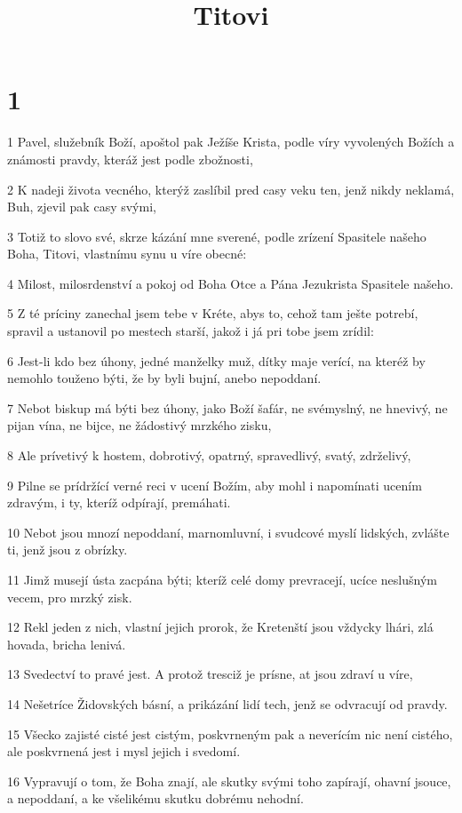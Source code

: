

\title{Titovi}

\chapter{1}

\par 1 Pavel, služebník Boží, apoštol pak Ježíše Krista, podle víry vyvolených Božích a známosti pravdy, kteráž jest podle zbožnosti,
\par 2 K nadeji života vecného, kterýž zaslíbil pred casy veku ten, jenž nikdy neklamá, Buh, zjevil pak casy svými,
\par 3 Totiž to slovo své, skrze kázání mne sverené, podle zrízení Spasitele našeho Boha, Titovi, vlastnímu synu u víre obecné:
\par 4 Milost, milosrdenství a pokoj od Boha Otce a Pána Jezukrista Spasitele našeho.
\par 5 Z té príciny zanechal jsem tebe v Kréte, abys to, cehož tam ješte potrebí, spravil a ustanovil po mestech starší, jakož i já pri tobe jsem zrídil:
\par 6 Jest-li kdo bez úhony, jedné manželky muž, dítky maje verící, na kteréž by nemohlo touženo býti, že by byli bujní, anebo nepoddaní.
\par 7 Nebot biskup má býti bez úhony, jako Boží šafár, ne svémyslný, ne hnevivý, ne pijan vína, ne bijce, ne žádostivý mrzkého zisku,
\par 8 Ale prívetivý k hostem, dobrotivý, opatrný, spravedlivý, svatý, zdrželivý,
\par 9 Pilne se prídržící verné reci v ucení Božím, aby mohl i napomínati ucením zdravým, i ty, kteríž odpírají, premáhati.
\par 10 Nebot jsou mnozí nepoddaní, marnomluvní, i svudcové myslí lidských, zvlášte ti, jenž jsou z obrízky.
\par 11 Jimž musejí ústa zacpána býti; kteríž celé domy prevracejí, ucíce neslušným vecem, pro mrzký zisk.
\par 12 Rekl jeden z nich, vlastní jejich prorok, že Kretenští jsou vždycky lhári, zlá hovada, bricha lenivá.
\par 13 Svedectví to pravé jest. A protož tresciž je prísne, at jsou zdraví u víre,
\par 14 Nešetríce Židovských básní, a prikázání lidí tech, jenž se odvracují od pravdy.
\par 15 Všecko zajisté cisté jest cistým, poskvrneným pak a neverícím nic není cistého, ale poskvrnená jest i mysl jejich i svedomí.
\par 16 Vypravují o tom, že Boha znají, ale skutky svými toho zapírají, ohavní jsouce, a nepoddaní, a ke všelikému skutku dobrému nehodní.

